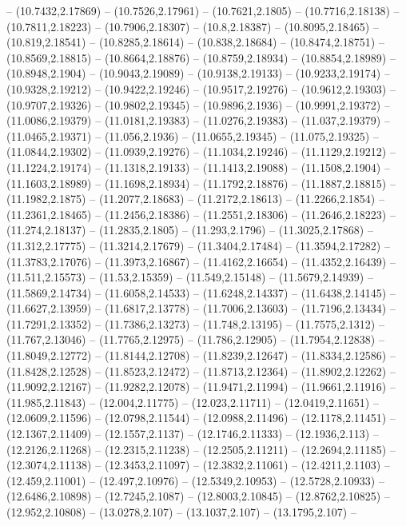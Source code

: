  -- (10.7432,2.17869) -- (10.7526,2.17961) -- (10.7621,2.1805) -- (10.7716,2.18138) -- (10.7811,2.18223) -- (10.7906,2.18307) -- (10.8,2.18387) -- (10.8095,2.18465) -- (10.819,2.18541) -- (10.8285,2.18614) -- (10.838,2.18684) -- (10.8474,2.18751) --
 (10.8569,2.18815) -- (10.8664,2.18876) -- (10.8759,2.18934) -- (10.8854,2.18989) -- (10.8948,2.1904) -- (10.9043,2.19089) -- (10.9138,2.19133) -- (10.9233,2.19174) -- (10.9328,2.19212) -- (10.9422,2.19246) -- (10.9517,2.19276) -- (10.9612,2.19303)
 -- (10.9707,2.19326) -- (10.9802,2.19345) -- (10.9896,2.1936) -- (10.9991,2.19372) -- (11.0086,2.19379) -- (11.0181,2.19383) -- (11.0276,2.19383) -- (11.037,2.19379) -- (11.0465,2.19371) -- (11.056,2.1936) -- (11.0655,2.19345) -- (11.075,2.19325) --
 (11.0844,2.19302) -- (11.0939,2.19276) -- (11.1034,2.19246) -- (11.1129,2.19212) -- (11.1224,2.19174) -- (11.1318,2.19133) -- (11.1413,2.19088) -- (11.1508,2.1904) -- (11.1603,2.18989) -- (11.1698,2.18934) -- (11.1792,2.18876) -- (11.1887,2.18815)
 -- (11.1982,2.1875) -- (11.2077,2.18683) -- (11.2172,2.18613) -- (11.2266,2.1854) -- (11.2361,2.18465) -- (11.2456,2.18386) -- (11.2551,2.18306) -- (11.2646,2.18223) -- (11.274,2.18137) -- (11.2835,2.1805) -- (11.293,2.1796) -- (11.3025,2.17868) --
 (11.312,2.17775) -- (11.3214,2.17679) -- (11.3404,2.17484) -- (11.3594,2.17282) -- (11.3783,2.17076) -- (11.3973,2.16867) -- (11.4162,2.16654) -- (11.4352,2.16439) -- (11.511,2.15573) -- (11.53,2.15359) -- (11.549,2.15148) -- (11.5679,2.14939) --
 (11.5869,2.14734) -- (11.6058,2.14533) -- (11.6248,2.14337) -- (11.6438,2.14145) -- (11.6627,2.13959) -- (11.6817,2.13778) -- (11.7006,2.13603) -- (11.7196,2.13434) -- (11.7291,2.13352) -- (11.7386,2.13273) -- (11.748,2.13195) -- (11.7575,2.1312) --
 (11.767,2.13046) -- (11.7765,2.12975) -- (11.786,2.12905) -- (11.7954,2.12838) -- (11.8049,2.12772) -- (11.8144,2.12708) -- (11.8239,2.12647) -- (11.8334,2.12586) -- (11.8428,2.12528) -- (11.8523,2.12472) -- (11.8713,2.12364) -- (11.8902,2.12262) --
 (11.9092,2.12167) -- (11.9282,2.12078) -- (11.9471,2.11994) -- (11.9661,2.11916) -- (11.985,2.11843) -- (12.004,2.11775) -- (12.023,2.11711) -- (12.0419,2.11651) -- (12.0609,2.11596) -- (12.0798,2.11544) -- (12.0988,2.11496) -- (12.1178,2.11451) --
 (12.1367,2.11409) -- (12.1557,2.1137) -- (12.1746,2.11333) -- (12.1936,2.113) -- (12.2126,2.11268) -- (12.2315,2.11238) -- (12.2505,2.11211) -- (12.2694,2.11185) -- (12.3074,2.11138) -- (12.3453,2.11097) -- (12.3832,2.11061) -- (12.4211,2.1103) --
 (12.459,2.11001) -- (12.497,2.10976) -- (12.5349,2.10953) -- (12.5728,2.10933) -- (12.6486,2.10898) -- (12.7245,2.1087) -- (12.8003,2.10845) -- (12.8762,2.10825) -- (12.952,2.10808) -- (13.0278,2.107) -- (13.1037,2.107) -- (13.1795,2.107) --

